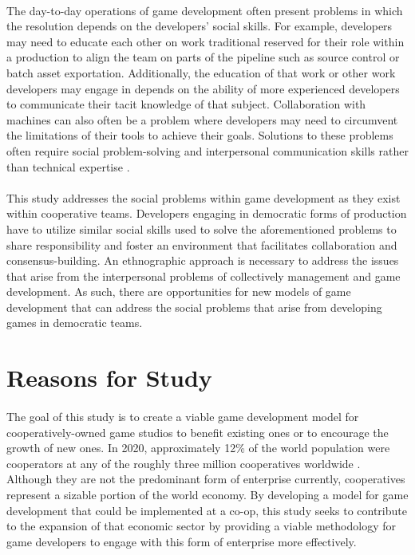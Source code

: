
\paragraph{} The day-to-day operations of game development often present problems in which the resolution depends on the developers' social skills. For example, developers may need to educate each other on work traditional reserved for their role within a production to align the team on parts of the pipeline such as source control or batch asset exportation. Additionally, the education of that work or other work developers may engage in depends on the ability of more experienced developers to communicate their tacit knowledge of that subject. Collaboration with machines can also often be a problem where developers may need to circumvent the limitations of their tools to achieve their goals. Solutions to these problems often require social problem-solving and interpersonal communication skills rather than technical expertise \autocite{whitson_what_2020}.

\paragraph{} This study addresses the social problems within game development as they exist within cooperative teams. Developers engaging in democratic forms of production have to utilize similar social skills used to solve the aforementioned problems to share responsibility and foster an environment that facilitates collaboration and consensus-building. An ethnographic approach is necessary to address the issues that arise from the interpersonal problems of collectively management and game development. As such, there are opportunities for new models of game development that can address the social problems that arise from developing games in democratic teams.

\section{Reasons for Study}

\paragraph{} The goal of this study is to create a viable game development model for cooperatively-owned game studios to benefit existing ones or to encourage the growth of new ones. In 2020, approximately 12\% of the world population were cooperators at any of the roughly three million cooperatives worldwide \autocite{world_cooperative_monitor_exploring_2020}. Although they are not the predominant form of enterprise currently, cooperatives represent a sizable portion of the world economy. By developing a model for game development that could be implemented at a co-op, this study seeks to contribute to the expansion of that economic sector by providing a viable methodology for game developers to engage with this form of enterprise more effectively.

